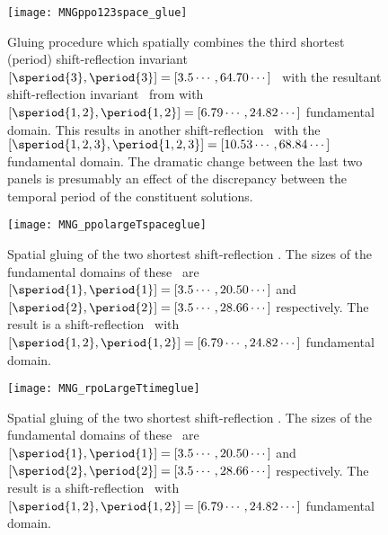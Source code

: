 \begin{itemize}
{\begin{figure}
\begin{minipage}[height=.4\textheight]{.99\textwidth}
\centering
\texttt{[image: MNGppo123space\_glue]}
\end{minipage}
\caption{ \label{fig:ppo123spaceglue}
Gluing procedure which spatially combines the third shortest (period) shift-reflection
invariant
$[\speriod{3},\period{3}]=[3.5\cdots,64.70\cdots]$
\twot\
 with the resultant shift-reflection invariant \twot\
from
with
$[\speriod{1,2},\period{1,2}]=[6.79\cdots,24.82\cdots]$
fundamental domain.
This results in another shift-reflection
\twot\ with the
$[\speriod{1,2,3},\period{1,2,3}]=[10.53\cdots,68.84\cdots]$
 fundamental domain.
The dramatic change between the last
two panels is presumably an effect of the
discrepancy between the temporal period of
the constituent solutions.
}
\end{figure}


\begin{figure}
\centering
\begin{minipage}[height=.4\textheight]{.66\textwidth}
\centering
\texttt{[image: MNG\_ppolargeTspaceglue]}
\end{minipage}
\caption{ \label{fig:MNGppo12spaceglue1}
Spatial gluing of the two shortest shift-reflection
\twots. The sizes of the fundamental domains of these
\twots\ are
$[\speriod{1},\period{1}]=[3.5\cdots,20.50\cdots]$
and
$[\speriod{2},\period{2}]=[3.5\cdots,28.66\cdots]$
respectively.
The result is a
shift-reflection \twot\ with
$[\speriod{1,2},\period{1,2}]=[6.79\cdots,24.82\cdots]$
fundamental domain.
}
\end{figure}


\begin{figure}
\centering
\begin{minipage}[height=.4\textheight]{.66\textwidth}
\centering
\texttt{[image: MNG\_rpoLargeTtimeglue]}
\end{minipage}
\caption{ \label{fig:MNGppo12spaceglue2}
Spatial gluing of the two shortest shift-reflection
\twots. The sizes of the fundamental domains of these
\twots\ are
$[\speriod{1},\period{1}]=[3.5\cdots,20.50\cdots]$
and
$[\speriod{2},\period{2}]=[3.5\cdots,28.66\cdots]$
respectively.
The result is a
shift-reflection \twot\ with
$[\speriod{1,2},\period{1,2}]=[6.79\cdots,24.82\cdots]$
fundamental domain.
}
\end{figure}


}
\end{itemize}
